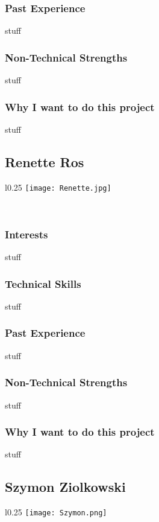 \subsubsection{Past Experience} stuff 
\subsubsection{Non-Technical Strengths} stuff
\subsubsection{Why I want to do this project} stuff

\subsection{Renette Ros}
\begin{wrapfigure}[8]{l}{0.25\textwidth}
\vspace{10pt}
\texttt{[image: Renette.jpg]}
\vspace{10pt}
\end{wrapfigure}

\textcolor{white}{.}
\subsubsection{Interests} stuff
\subsubsection{Technical Skills} stuff
\subsubsection{Past Experience} stuff
\subsubsection{Non-Technical Strengths} stuff
\subsubsection{Why I want to do this project} stuff


\subsection{Szymon Ziolkowski}
\begin{wrapfigure}[5]{l}{0.25\textwidth}
\vspace{10pt}
\texttt{[image: Szymon.png]}
\end{wrapfigure}

